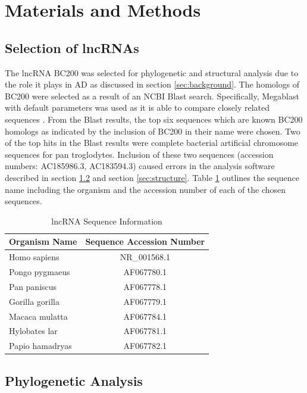 \documentclass[conference]{IEEEtran}
\begin{document}
\section{Materials and Methods}\label{sec:methods}

\subsection{Selection of lncRNAs}\label{sec:lncRNA-selection}
The lncRNA BC200 was selected for phylogenetic and structural analysis due to the role it plays in AD as discussed in section \ref{sec:background}. 
The homologs of BC200 were selected as a result of an NCBI Blast \cite{blastTool} search. 
Specifically, Megablast \cite{morgulis2008database} with default parameters was used as it is able to compare closely related sequences \cite{amirmahani2018phylogenetic}. 
From the Blast results, the top six sequences which are known BC200 homologs as indicated by the inclusion of BC200 in their name were chosen. 
Two of the top hits in the Blast results were complete bacterial artificial chromosome sequences for pan troglodytes. 
Inclusion of these two sequences (accession numbers: AC185986.3, AC183594.3) caused errors in the analysis software described in section \ref{sec:phylo} and section \ref{sec:structure}. 
Table \ref{tbl:accession} outlines the sequence name including the organism and the accession number of each of the chosen sequences. 

\begin{table}[ht]
  \centering
  \caption{lncRNA Sequence Information}
  \label{tbl:accession}
  \begin{tabular}{lc}
    \toprule
    Organism Name & Sequence Accession Number \\
    \midrule
    Homo sapiens    & NR\_001568.1 \\
    Pongo pygmaeus  & AF067780.1 \\
    Pan paniscus    & AF067778.1 \\
    Gorilla gorilla & AF067779.1 \\
    Macaca mulatta  & AF067784.1 \\
    Hylobates lar   & AF067781.1 \\
    Papio hamadryas & AF067782.1 \\
    \bottomrule
  \end{tabular}
\end{table}

\subsection{Phylogenetic Analysis}\label{sec:phylo}
\end{document}
